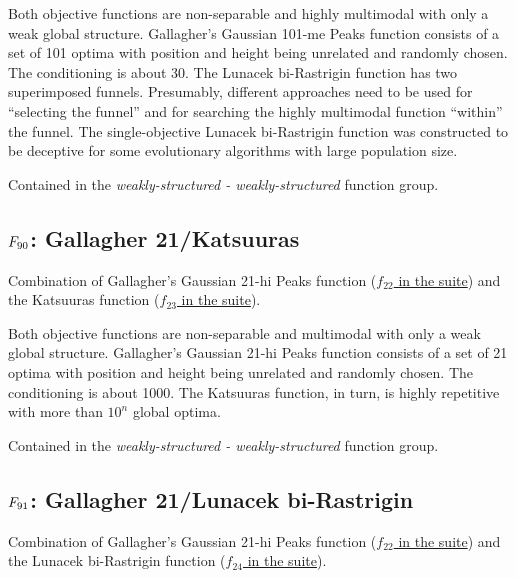 Both objective functions are non-separable and highly multimodal with
only a weak global structure. Gallagher's Gaussian 101-me Peaks
function consists of a set of 101 optima with position and height being
unrelated and randomly chosen. The conditioning is about 30.
The Lunacek bi-Rastrigin function has two superimposed funnels. Presumably,
different approaches need to be used for ``selecting the funnel''
and for searching the highly multimodal function ``within'' the funnel.
The single-objective Lunacek bi-Rastrigin function was constructed
to be deceptive for some evolutionary algorithms with large population size.

Contained in the \emph{weakly-structured - weakly-structured} function group.



\subsection[\texorpdfstring{\protect\(F_{90}\protect\): Gallagher 21/Katsuuras}{F90: Gallagher 21/Katsuuras}]{\texorpdfstring{\protect\(F_{90}\protect\): Gallagher 21/Katsuuras}{}}
\label{index:gallagher-21-katsuuras}\label{index:f90}
Combination of Gallagher’s Gaussian 21-hi Peaks function (\href{https://coco.gforge.inria.fr/downloads/download16.00/bbobdocfunctions.pdf\#page=110}{\(f_{22}\) in the \bbob suite}) and the
Katsuuras function (\href{https://coco.gforge.inria.fr/downloads/download16.00/bbobdocfunctions.pdf\#page=115}{\(f_{23}\) in the \bbob suite}).

Both objective functions are non-separable and multimodal with
only a weak global structure. Gallagher's Gaussian 21-hi Peaks
function consists of a set of 21 optima with position and height being
unrelated and randomly chosen. The conditioning is about 1000.
The Katsuuras function, in turn, is highly repetitive with more than \(10^n\)
global optima.

Contained in the \emph{weakly-structured - weakly-structured} function group.



\subsection[\texorpdfstring{\protect\(F_{91}\protect\): Gallagher 21/Lunacek bi-Rastrigin}{F91: Gallagher 21/Lunacek bi-Rastrigin}]{\texorpdfstring{\protect\(F_{91}\protect\): Gallagher 21/Lunacek bi-Rastrigin}{}}
\label{index:f91}\label{index:gallagher-21-lunacek-bi-rastrigin}
Combination of Gallagher’s Gaussian 21-hi Peaks function (\href{https://coco.gforge.inria.fr/downloads/download16.00/bbobdocfunctions.pdf\#page=110}{\(f_{22}\) in the \bbob suite}) and the
Lunacek bi-Rastrigin function (\href{https://coco.gforge.inria.fr/downloads/download16.00/bbobdocfunctions.pdf\#page=120}{\(f_{24}\) in the \bbob suite}).


